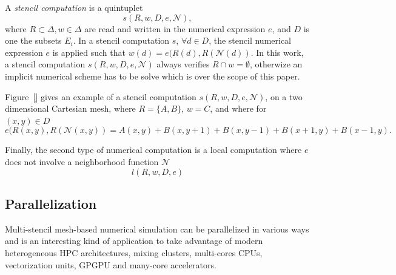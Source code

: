 A \textit{stencil computation} is a quintuplet
\begin{equation}
s(R,w,D,e,\mathcal{N}),
\end{equation}
where $R \subset \Delta, w \in \Delta$ are read and written in the numerical expression $e$, and $D$ is one the subsets $E_i$. In a stencil computation $s$, $\forall d \in D$, the stencil numerical expression $e$ is applied such that $w(d) = e(R(d),R(\mathcal{N}(d))$. In this work, a stencil computation $s(R,w,D,e,\mathcal{N})$ always verifies $R \cap w = \emptyset$, otherwize an implicit numerical scheme has to be solve which is over the scope of this paper.

Figure~\ref{} gives an example of a stencil computation $s(R,w,D,e,\mathcal{N})$, on a two dimensional Cartesian mesh, where $R=\{A,B\}$, $w=C$, and where for $(x,y) \in D$
\begin{equation*}
e(R(x,y),R(\mathcal{N}(x,y)) = A(x,y)+B(x,y+1)+B(x,y-1)+B(x+1,y)+B(x-1,y).
\end{equation*}

Finally, the second type of numerical computation is a local computation where $e$ does not involve a neighborhood function $\mathcal{N}$
\begin{equation}
l(R,w,D,e)
\end{equation}

\subsection{Parallelization}
\label{sect:parall}
Multi-stencil mesh-based numerical simulation can be parallelized in various ways and is an interesting kind of application to take advantage of modern heterogeneous HPC architectures, mixing clusters, multi-cores CPUs, vectorization units, GPGPU and many-core accelerators.

